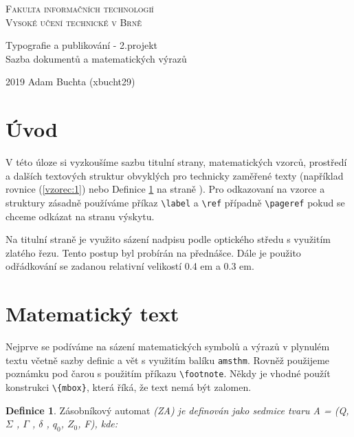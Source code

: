 \documentclass[a4paper,11pt]{article}
\theoremstyle{definition}
\newtheorem{definition}{Definice}
\theoremstyle{plain}
\begin{document}
\begin{center}
\thispagestyle{empty}
  \Huge{\textsc{Fakulta informačních technologií \\
  Vysoké učení technické v Brně}}

  \LARGE{Typografie a publikování - 2.projekt  \\
  Sazba dokumentů a matematických výrazů}

\end{center}

  \Large{ 2019 \hfill Adam Buchta (xbucht29)}
  \newpage
  \twocolumn
  {\fontsize{11pt}{14pt}\selectfont
  \setcounter{page}{1}
  \section*{Úvod}

   V této úloze si vyzkoušíme sazbu titulní strany, matematických vzorců, prostředí a dalších textových struktur obvyklých pro technicky zaměřené texty (například rovnice (\ref{vzorec:1})
   nebo Definice \ref{definice:1} na straně \pageref{definice:1}). Pro odkazovaní na vzorce
   a struktury zásadně používáme příkaz \verb"\label" a \verb"\ref"
   případně \verb"\pageref" pokud se chceme odkázat na stranu výskytu.

   Na titulní straně je využito sázení nadpisu podle optického středu s využitím zlatého řezu. Tento postup byl
   probírán na přednášce. Dále je použito odřádkování se
   zadanou relativní velikostí 0.4 em a 0.3 em.


  \section{Matematický text}

   Nejprve se podíváme na sázení matematických symbolů
   a výrazů v plynulém textu včetně sazby definic a vět s využitím balíku \verb"amsthm". Rovněž použijeme poznámku pod čarou s použitím příkazu \verb"\footnote". Někdy je vhodné použít konstrukci \verb"\{mbox}", která říká, že text nemá být zalomen.
   \begin{definition}{}\label{definice:1}
   Zásobníkový automat
   \emph{(ZA) je definován jako sedmice tvaru
   A = (Q, $\Sigma$ , $\Gamma$ , $\delta$ , $q_{0}$, $Z_{0}$, F), kde:}
   \end{definition}

}
\end{document}
